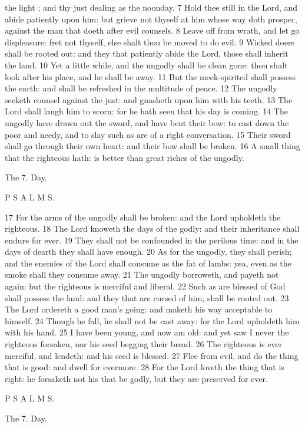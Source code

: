 the light ; and thy just dealing as the noonday. 7 Hold thee still in the Lord, and abide patiently upon him: but grieve not thyself at him whose way doth prosper, against the man that doeth after evil counsels. 8 Leave off from wrath, and let go displeasure: fret not thyself, else shalt thou be moved to do evil. 9 Wicked doers shall be rooted out: and they that patiently abide the Lord, those shall inherit the land. 10 Yet a little while, and the ungodly shall be clean gone: thou shalt look after his place, and he shall be away. 11 But the meek-spirited shall possess the earth: and shall be refreshed in the multitude of peace. 12 The ungodly seeketh counsel against the just: and gnasheth upon him with his teeth. 13 The Lord shall laugh him to scorn: for he hath seen that his day is coming. 14 The ungodly have drawn out the sword, and have bent their bow: to cast down the poor and needy, and to slay such as are of a right conversation. 15 Their sword shall go through their own heart: and their bow shall be broken. 16 A small thing that the righteous hath: is better than great riches of the ungodly.

The 7. Day.

P S A L M S.

17 For the arms of the ungodly shall be broken: and the Lord upholdeth the righteous. 18 The Lord knoweth the days of the godly: and their inheritance shall endure for ever. 19 They shall not be confounded in the perilous time: and in the days of dearth they shall have enough. 20 As for the ungodly, they shall perish; and the enemies of the Lord shall consume as the fat of lambs: yea, even as the smoke shall they consume away. 21 The ungodly borroweth, and payeth not again: but the righteous is merciful and liberal. 22 Such as are blessed of God shall possess the land: and they that are cursed of him, shall be rooted out. 23 The Lord ordereth a good man’s going: and maketh his way acceptable to himself. 24 Though he fall, he shall not be cast away: for the Lord upholdeth him with his hand. 25 I have been young, and now am old: and yet saw I never the righteous forsaken, nor his seed begging their bread. 26 The righteous is ever merciful, and lendeth: and his seed is blessed. 27 Flee from evil, and do the thing that is good: and dwell for evermore. 28 For the Lord loveth the thing that is right: he forsaketh not his that be godly, but they are preserved for ever.

P S A L M S.

The 7. Day.

